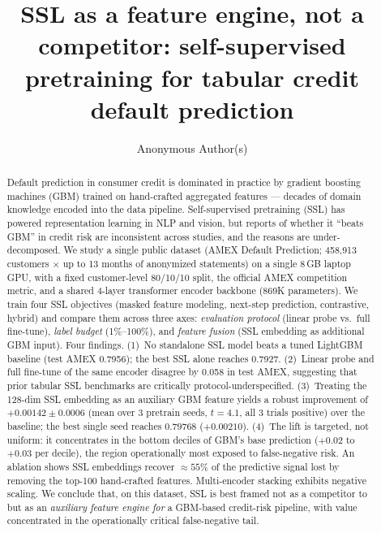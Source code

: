 \documentclass[sigconf, anonymous, review]{acmart}
\title{SSL as a feature engine, not a competitor: self-supervised
pretraining for tabular credit default prediction}
\author{Anonymous Author(s)}
\affiliation{%
  \institution{Anonymous Institution}
  \country{}}
\begin{document}
\begin{abstract}
Default prediction in consumer credit is dominated in practice by
gradient boosting machines (GBM) trained on hand-crafted aggregated
features --- decades of domain knowledge encoded into the data
pipeline. Self-supervised pretraining (SSL) has powered representation
learning in NLP and vision, but reports of whether it ``beats GBM'' in
credit risk are inconsistent across studies, and the reasons are
under-decomposed. We study a single public dataset
(AMEX Default Prediction; 458{,}913 customers $\times$ up to 13 months
of anonymized statements) on a single 8\,GB laptop GPU, with a fixed
customer-level 80/10/10 split, the official AMEX competition metric,
and a shared 4-layer transformer encoder backbone (869K parameters).
We train four SSL objectives (masked feature modeling, next-step
prediction, contrastive, hybrid) and compare them across three axes:
\emph{evaluation protocol} (linear probe vs.\ full fine-tune),
\emph{label budget} (1\%--100\%), and \emph{feature fusion}
(SSL embedding as additional GBM input). Four findings.
(1)~No standalone SSL model beats a tuned LightGBM baseline
(test AMEX 0.7956); the best SSL alone reaches 0.7927.
(2)~Linear probe and full fine-tune of the same encoder disagree by
0.058 in test AMEX, suggesting that prior tabular SSL benchmarks are
critically protocol-underspecified.
(3)~Treating the 128-dim SSL embedding as an auxiliary GBM feature
yields a robust improvement of $+0.00142 \pm 0.0006$ (mean over
3 pretrain seeds, $t = 4.1$, all 3 trials positive) over the
baseline; the best single seed reaches $0.79768$ ($+0.00210$).
(4)~The lift is targeted, not uniform: it concentrates in the bottom
deciles of GBM's base prediction ($+0.02$ to $+0.03$ per decile),
the region operationally most exposed to false-negative risk. An
ablation shows SSL embeddings recover $\approx 55\%$ of the
predictive signal lost by removing the top-100 hand-crafted
features. Multi-encoder stacking exhibits negative scaling.
We conclude that, on this dataset, SSL is best framed not as a
competitor to but as an \emph{auxiliary feature engine for} a
GBM-based credit-risk pipeline, with value concentrated in the
operationally critical false-negative tail.
\end{abstract}


\maketitle
\end{document}
